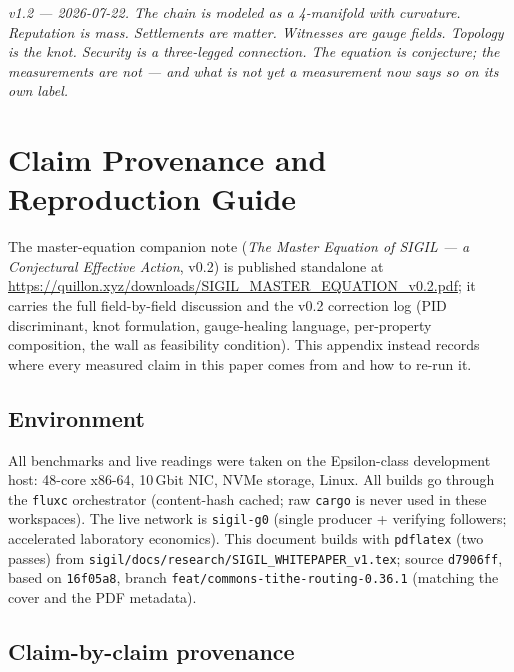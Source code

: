 \documentclass[10pt,a4paper]{article}
\begin{document}
\vspace{0.6em}
\noindent\textit{v1.2 — 2026-07-22. The chain is modeled as a 4-manifold with
curvature. Reputation is mass. Settlements are matter. Witnesses are gauge fields.
Topology is the knot. Security is a three-legged connection. The equation is
conjecture; the measurements are not — and what is not yet a measurement now says
so on its own label.}

\clearpage
\appendix

\section{Claim Provenance and Reproduction Guide}\label{app:meq}

The master-equation companion note (\emph{The Master Equation of SIGIL — a Conjectural
Effective Action}, v0.2) is published standalone at
\url{https://quillon.xyz/downloads/SIGIL_MASTER_EQUATION_v0.2.pdf}; it carries the full
field-by-field discussion and the v0.2 correction log (PID discriminant, knot
formulation, gauge-healing language, per-property composition, the wall as feasibility
condition). This appendix instead records where every measured claim in this paper
comes from and how to re-run it.

\subsection{Environment}

All benchmarks and live readings were taken on the Epsilon-class development host:
48-core x86-64, 10\,Gbit NIC, NVMe storage, Linux. All builds go through the
\texttt{fluxc} orchestrator (content-hash cached; raw \texttt{cargo} is never used in
these workspaces). The live network is \texttt{sigil-g0} (single producer + verifying
followers; accelerated laboratory economics). This document builds with
\texttt{pdflatex} (two passes) from
\texttt{sigil/docs/research/SIGIL\_WHITEPAPER\_v1.tex}; source \texttt{d7906ff}, based
on \texttt{16f05a8}, branch \texttt{feat/commons-tithe-routing-0.36.1} (matching the
cover and the PDF metadata).

\subsection{Claim-by-claim provenance}
\end{document}
